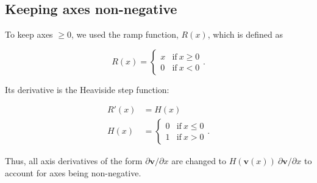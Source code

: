 \subsection*{Keeping axes non-negative}

To keep axes $\ge 0$, we used the ramp function, $R(x)$, which is defined as

\begin{equation*}
    R(x) = \begin{cases}
        x & \text{if}\ x \ge 0 \\
        0 & \text{if}\ x < 0
        \end{cases}
    \text{.}
\end{equation*}


\noindent Its derivative is the Heaviside step function:

\begin{equation*}
\begin{split}
    R'(x) &= H(x) \\
    H(x) &= \begin{cases}
        0 & \text{if}\ x \le 0 \\
        1 & \text{if}\ x > 0
        \end{cases}
    \text{.}
\end{split}
\end{equation*}


Thus, all axis derivatives of the form $\partial \mathbf{v} / \partial x$
are changed to $H(\mathbf{v}(x)) \: \partial \mathbf{v} / \partial x$ to 
account for axes being non-negative.


